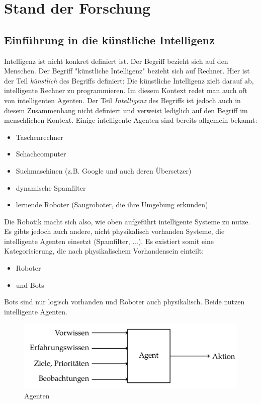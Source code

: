 \chapter{Stand der Forschung}
\section{Einführung in die künstliche Intelligenz}
Intelligenz ist nicht konkret definiert ist. Der Begriff bezieht sich auf den Menschen. Der Begriff "künstliche Intelligenz" bezieht sich auf Rechner. Hier ist der Teil \textit{künstlich} des Begriffs definiert: Die künstliche Intelligenz zielt darauf ab, intelligente Rechner zu programmieren. Im diesem Kontext redet man auch oft von intelligenten Agenten. Der Teil \textit{Intelligenz} des Begriffs ist jedoch auch in diesem Zusammenhang nicht definiert und verweist lediglich auf den Begriff im menschlichen Kontext.
Einige intelligente Agenten sind bereits allgemein bekannt:
\begin{itemize}
\item Taschenrechner
\item Schachcomputer
\item Suchmaschinen (z.B. Google und auch deren Übersetzer)
\item dynamische Spamfilter 
\item lernende Roboter (Saugroboter, die ihre Umgebung erkunden) 
\end{itemize}

Die Robotik macht sich also, wie oben aufgeführt intelligente Systeme zu nutze. Es gibts jedoch auch andere, nicht physikalisch vorhanden Systeme, die intelligente Agenten einsetzt (Spamfilter, ...). Es existiert somit eine Kategorisierung, die nach physikalischem Vorhandensein einteilt:
\begin{itemize}
\item Roboter
\item und Bots
\end{itemize} 
Bots sind nur logisch vorhanden und Roboter auch physikalisch. Beide nutzen intelligente Agenten. 


\begin{figure}%
\includegraphics[scale=0.3]{bilder/agent} 
\caption{Agenten \cite{Schauss}}
\label{Agenten}
\end{figure}

